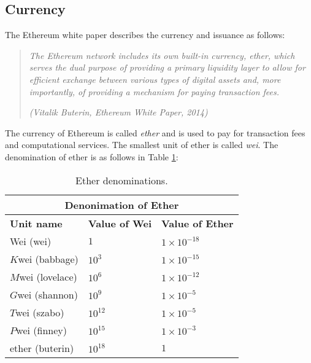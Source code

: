 \subsection{Currency}
\label{subsec:currency_and_issuance}


The Ethereum white paper \cite{ethereum_white_paper} describes the currency and issuance as follows:

\begin{quote}
  \textit{The Ethereum network includes its own built-in currency, ether, which serves the dual purpose of providing a primary
      liquidity layer to allow for efficient exchange between various types of digital assets and, more importantly, of providing a
      mechanism for paying transaction fees.}

  \textit{(Vitalik Buterin, Ethereum White Paper, 2014)}
\end{quote}

The currency of Ethereum is called \textit{ether} and is used to pay for transaction fees and computational services. The smallest unit
of ether is called \textit{wei}. The denomination of ether is as follows in Table \ref{tab:ether_denominations}:

\begin{table}[H]
  \centering
  \begin{tabular}{|l|l|l|}
      \hline
      \multicolumn{3}{|c|}{\textbf{Denonimation of Ether}}                 \\ \hline
      \textbf{Unit name} & \textbf{Value of Wei} & \textbf{Value of Ether} \\ \hline
      Wei (wei)          & $1$                   & $1\times10^{-18}$       \\ \hline
      $K$wei (babbage)   & $10^{3}$              & $1\times10^{-15}$       \\ \hline
      $M$wei (lovelace)  & $10^{6}$              & $1\times10^{-12}$       \\ \hline
      $G$wei (shannon)   & $10^{9}$              & $1\times10^{-5}$        \\ \hline
      $T$wei (szabo)     & $10^{12}$             & $1\times10^{-5}$        \\ \hline
      $P$wei (finney)    & $10^{15}$             & $1\times10^{-3}$        \\ \hline
      ether (buterin)    & $10^{18}$             & $1$                     \\ \hline
  \end{tabular}
  \caption{Ether denominations.}
  \label{tab:ether_denominations}
\end{table}


